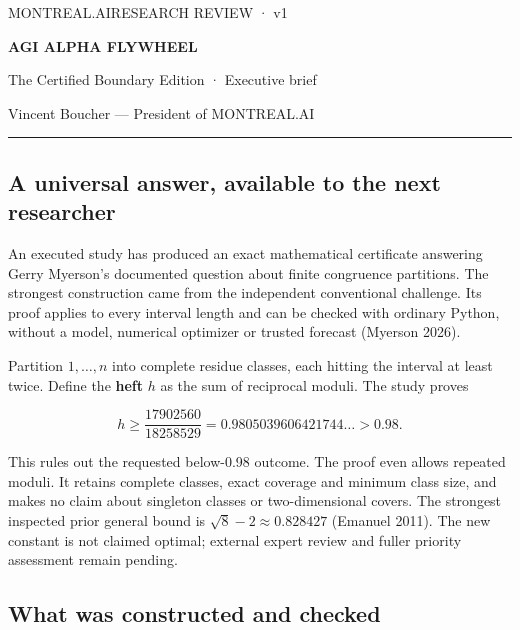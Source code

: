 \documentclass[11pt,a4paper]{article}
\begin{document}
{\sffamily\color{Purple}\small MONTREAL.AI\hfill RESEARCH REVIEW · v1}\par
\vspace{0.5em}
{\sffamily\bfseries\LARGE AGI ALPHA FLYWHEEL}\par
{\sffamily\large\color{Purple}The Certified Boundary Edition · Executive
brief}\par
\vspace{0.5em}
{\small Vincent Boucher --- President of MONTREAL.AI}\par
\noindent\textcolor{Gold}{\rule{\linewidth}{0.7pt}}

\hypertarget{a-universal-answer-available-to-the-next-researcher}{%
\subsection{A universal answer, available to the next
researcher}\label{a-universal-answer-available-to-the-next-researcher}}

An executed study has produced an exact mathematical certificate
answering Gerry Myerson's documented question about finite congruence
partitions. The strongest construction came from the independent
conventional challenge. Its proof applies to every interval length and
can be checked with ordinary Python, without a model, numerical
optimizer or trusted forecast (Myerson 2026).

\begin{samepage}

Partition \(1,\ldots,n\) into complete residue classes, each hitting the
interval at least twice. Define the \textbf{heft} \(h\) as the sum of
reciprocal moduli. The study proves

\[\boxed{\displaystyle h\ge\frac{17902560}{18258529}
=0.9805039606421744\ldots>0.98.}\]

\end{samepage}

This rules out the requested below-0.98 outcome. The proof even allows
repeated moduli. It retains complete classes, exact coverage and minimum
class size, and makes no claim about singleton classes or
two-dimensional covers. The strongest inspected prior general bound is
\(\sqrt8-2\approx0.828427\) (Emanuel 2011). The new constant is not
claimed optimal; external expert review and fuller priority assessment
remain pending.


\hypertarget{what-was-constructed-and-checked}{%
\subsection{What was constructed and
checked}\label{what-was-constructed-and-checked}}
\end{document}
